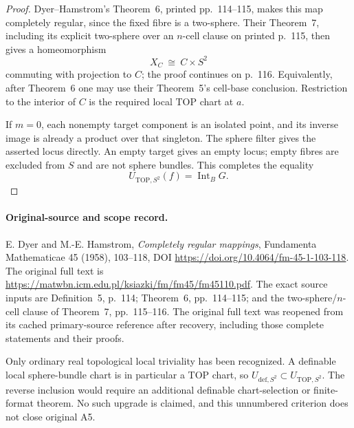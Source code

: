 \begin{proof}
Dyer--Hamstrom's Theorem~6, printed pp.~114--115, makes this map
completely regular, since the fixed fibre is a two-sphere. Their
Theorem~7, including its explicit two-sphere over an $n$-cell clause
on printed p.~115, then gives a homeomorphism
\[
 X_C\ \cong\ C\times S^2
\]
commuting with projection to $C$; the proof continues on p.~116.
Equivalently, after Theorem~6 one may use their Theorem~5's cell-base
conclusion. Restriction to the interior of $C$ is the required local
TOP chart at $a$.

If $m=0$, each nonempty target component is an isolated point, and its
inverse image is already a product over that singleton. The sphere
filter gives the asserted locus directly. An empty target gives an
empty locus; empty fibres are excluded from $S$ and are not sphere
bundles. This completes the equality
\[
 U_{\mathrm{TOP},S^2}(f)=\operatorname{Int}_B G.
 \tag{S2.4}
\]
\end{proof}

\paragraph{Original-source and scope record.}
E. Dyer and M.-E. Hamstrom, \emph{Completely regular mappings},
Fundamenta Mathematicae 45 (1958), 103--118,
DOI \url{https://doi.org/10.4064/fm-45-1-103-118}.
The original full text is
\url{https://matwbn.icm.edu.pl/ksiazki/fm/fm45/fm45110.pdf}.
The exact source inputs are Definition~5, p.~114; Theorem~6,
pp.~114--115; and the two-sphere/$n$-cell clause of Theorem~7,
pp.~115--116. The original full text was reopened from its cached
primary-source reference after recovery, including those complete
statements and their proofs.

Only ordinary real topological local triviality has been recognized.
A definable local sphere-bundle chart is in particular a TOP chart,
so $U_{\mathrm{def},S^2}\subset U_{\mathrm{TOP},S^2}$. The reverse
inclusion would require an additional definable chart-selection or
finite-format theorem. No such upgrade is claimed, and this
unnumbered criterion does not close original A5.
